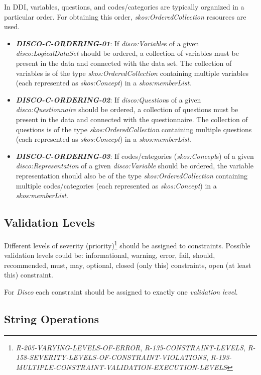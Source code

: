 \documentclass{llncs}
\begin{document}
In DDI, variables, questions, and codes/categories are typically organized in a particular order. 
For obtaining this order, {\em skos:OrderedCollection} resources are used. 

\begin{itemize}
	\item \textbf{{\em DISCO-C-ORDERING-01}}: If \emph{disco:Variable}s of a given \emph{disco:LogicalDataSet} should be ordered, a collection of variables must be present in the data and connected with the data set. The collection of variables is of the type {\em skos:OrderedCollection} containing multiple variables (each represented as {\em skos:Concept}) in a {\em skos:memberList}. 
	\item \textbf{{\em DISCO-C-ORDERING-02}}: If \emph{disco:Question}s of a given \emph{disco:Questionnaire} should be ordered, a collection of questions must be present in the data and connected with the questionnaire. The collection of questions is of the type {\em skos:OrderedCollection} containing multiple questions (each represented as {\em skos:Concept}) in a {\em skos:memberList}. 
	\item \textbf{{\em DISCO-C-ORDERING-03}}: If codes/categories (\emph{skos:Concept}s) of a given \emph{disco:Representation} of a given \emph{disco:Variable} should be ordered, the variable representation should also be of the type {\em skos:OrderedCollection} containing multiple codes/categories (each represented as {\em skos:Concept}) in a {\em skos:memberList}. 
\end{itemize}

\subsection{Validation Levels}

Different levels of severity (priority)\footnote{\emph{R-205-VARYING-LEVELS-OF-ERROR}, \emph{R-135-CONSTRAINT-LEVELS}, \emph{R-158-SEVERITY-LEVELS-OF-CONSTRAINT-VIOLATIONS}, \emph{R-193-MULTIPLE-CONSTRAINT-VALIDATION-EXECUTION-LEVELS}} should be assigned to constraints.
Possible validation levels could be: informational, warning, error, fail, should, recommended, must, may, optional, closed (only this) constraints, open (at least this) constraint.

For \emph{Disco} each constraint should be assigned to exactly one \emph{validation level}.

\subsection{String Operations}
\end{document}

